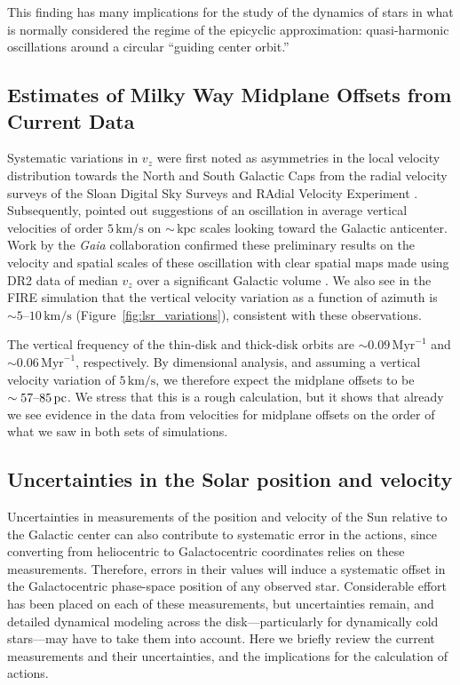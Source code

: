 \documentclass[twocolumn]{aastex62}
\newcommand{\pc}{\text{pc}}
\newcommand{\kpc}{\text{kpc}}
\newcommand{\Myr}{\text{Myr}}
\newcommand{\kms}{\text{km}/\text{s}}
\begin{document}
This finding has many implications for the study of the dynamics of stars in
what is normally considered the regime of the epicyclic approximation:
quasi-harmonic oscillations around a circular ``guiding center orbit.''

\subsection{Estimates of Milky Way Midplane Offsets from Current Data}
\label{ssec:mw_data_midplane}

Systematic variations in $v_z$ were first noted as asymmetries in the local
velocity distribution towards the North and South Galactic Caps from the
radial velocity surveys of the Sloan Digital Sky Surveys
\citep{2012ApJ...750L..41W} and RAdial Velocity Experiment
\citep{2013MNRAS.436..101W}. Subsequently, \citet{2013ApJ...777L...5C} pointed
out suggestions of an oscillation in average vertical velocities of order
$5\,\kms$  on $\sim\,\kpc$ scales looking toward the Galactic anticenter. Work
by the \textit{Gaia} collaboration confirmed these preliminary results on the
velocity and spatial scales of these oscillation with clear spatial maps made
using DR2 data of median $v_z$ over a significant Galactic volume
\citep{2018A&A...616A..11G, 2019arXiv190209569F}. We also see in the FIRE
simulation that the vertical velocity variation as a function of azimuth is
$\sim5\text{--}10\,\kms$ (Figure~\ref{fig:lsr_variations}), consistent with
these observations.

The vertical frequency of the thin-disk and thick-disk orbits are $\sim
0.09\,\Myr^{-1}$ and $\sim0.06\,\Myr^{-1}$, respectively. By dimensional
analysis, and assuming a vertical velocity variation of $5\,\kms$, we
therefore expect the midplane offsets to be $\sim 57\textup{--}85\,\pc$. We
stress that this is a rough calculation, but it shows that already we see
evidence in the data from velocities for midplane offsets on the order of what
we saw in both sets of simulations.

\subsection{Uncertainties in the Solar position and velocity}\label{ssec:coord_off}

Uncertainties in measurements of the position and velocity of the Sun relative
to the Galactic center can also contribute to systematic error in the actions, since converting from heliocentric to Galactocentric
coordinates relies on these measurements. Therefore, errors in their values
will induce a systematic offset in the Galactocentric phase-space position of
any observed star. Considerable effort has been placed on each of these measurements, but uncertainties remain, and detailed dynamical modeling across the disk---particularly for dynamically cold stars---may have to take them into
account. 
Here we briefly review the current measurements and their uncertainties, and the implications for the calculation of actions. 
\end{document}
